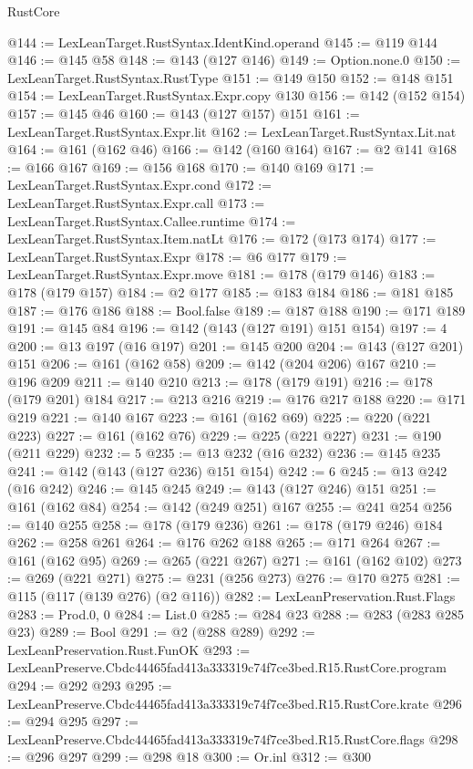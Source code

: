 \begin{lexlean}{RustCore}
\begin{coremodule}
@144 := LexLeanTarget.RustSyntax.IdentKind.operand
@145 := @119 @144
@146 := @145 @58
@148 := @143 (@127 @146)
@149 := Option.none.{0}
@150 := LexLeanTarget.RustSyntax.RustType
@151 := @149 @150
@152 := @148 @151
@154 := LexLeanTarget.RustSyntax.Expr.copy @130
@156 := @142 (@152 @154)
@157 := @145 @46
@160 := @143 (@127 @157) @151
@161 := LexLeanTarget.RustSyntax.Expr.lit
@162 := LexLeanTarget.RustSyntax.Lit.nat
@164 := @161 (@162 @46)
@166 := @142 (@160 @164)
@167 := @2 @141
@168 := @166 @167
@169 := @156 @168
@170 := @140 @169
@171 := LexLeanTarget.RustSyntax.Expr.cond
@172 := LexLeanTarget.RustSyntax.Expr.call
@173 := LexLeanTarget.RustSyntax.Callee.runtime
@174 := LexLeanTarget.RustSyntax.Item.natLt
@176 := @172 (@173 @174)
@177 := LexLeanTarget.RustSyntax.Expr
@178 := @6 @177
@179 := LexLeanTarget.RustSyntax.Expr.move
@181 := @178 (@179 @146)
@183 := @178 (@179 @157)
@184 := @2 @177
@185 := @183 @184
@186 := @181 @185
@187 := @176 @186
@188 := Bool.false
@189 := @187 @188
@190 := @171 @189
@191 := @145 @84
@196 := @142 (@143 (@127 @191) @151 @154)
@197 := 4
@200 := @13 @197 (@16 @197)
@201 := @145 @200
@204 := @143 (@127 @201) @151
@206 := @161 (@162 @58)
@209 := @142 (@204 @206) @167
@210 := @196 @209
@211 := @140 @210
@213 := @178 (@179 @191)
@216 := @178 (@179 @201) @184
@217 := @213 @216
@219 := @176 @217 @188
@220 := @171 @219
@221 := @140 @167
@223 := @161 (@162 @69)
@225 := @220 (@221 @223)
@227 := @161 (@162 @76)
@229 := @225 (@221 @227)
@231 := @190 (@211 @229)
@232 := 5
@235 := @13 @232 (@16 @232)
@236 := @145 @235
@241 := @142 (@143 (@127 @236) @151 @154)
@242 := 6
@245 := @13 @242 (@16 @242)
@246 := @145 @245
@249 := @143 (@127 @246) @151
@251 := @161 (@162 @84)
@254 := @142 (@249 @251) @167
@255 := @241 @254
@256 := @140 @255
@258 := @178 (@179 @236)
@261 := @178 (@179 @246) @184
@262 := @258 @261
@264 := @176 @262 @188
@265 := @171 @264
@267 := @161 (@162 @95)
@269 := @265 (@221 @267)
@271 := @161 (@162 @102)
@273 := @269 (@221 @271)
@275 := @231 (@256 @273)
@276 := @170 @275
@281 := @115 (@117 (@139 @276) (@2 @116))
@282 := LexLeanPreservation.Rust.Flags
@283 := Prod.{0, 0}
@284 := List.{0}
@285 := @284 @23
@288 := @283 (@283 @285 @23)
@289 := Bool
@291 := @2 (@288 @289)
@292 := LexLeanPreservation.Rust.FunOK
@293 := LexLeanPreserve.Cbdc44465fad413a333319c74f7ce3bed.R15.RustCore.program
@294 := @292 @293
@295 := LexLeanPreserve.Cbdc44465fad413a333319c74f7ce3bed.R15.RustCore.krate
@296 := @294 @295
@297 := LexLeanPreserve.Cbdc44465fad413a333319c74f7ce3bed.R15.RustCore.flags
@298 := @296 @297
@299 := @298 @18
@300 := Or.inl
@312 := @300

\end{coremodule}
\end{lexlean}
